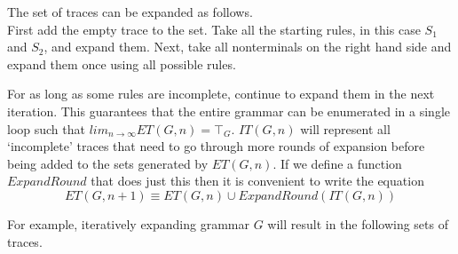 \documentclass[envcountsame,runningheads]{llncs}
\begin{document}
The set of traces can be expanded as follows.\\
First add the empty trace to the set. 
Take all the starting rules, in this case $S_1$ and $S_2$, and expand them.
Next, take all nonterminals on the right hand side and expand them once using all possible rules. 

For as long as some rules are incomplete, continue to expand them in the next iteration. This guarantees that the entire grammar can be enumerated in a single loop such that $lim_{n \to \infty} ET(G,n) = \top_{G}$.
$IT(G, n)$ will represent all `incomplete' traces that need to go through more rounds of expansion before being added to the sets generated by $ET(G, n)$.
If we define a function $ExpandRound$ that does just this then it is convenient to write the equation 
\begin{equation} ET(G, n+1) \equiv ET(G, n) \cup ExpandRound(IT(G, n)) \end{equation}

For example, iteratively expanding grammar $G$ will result in the following sets of traces.
\end{document}
